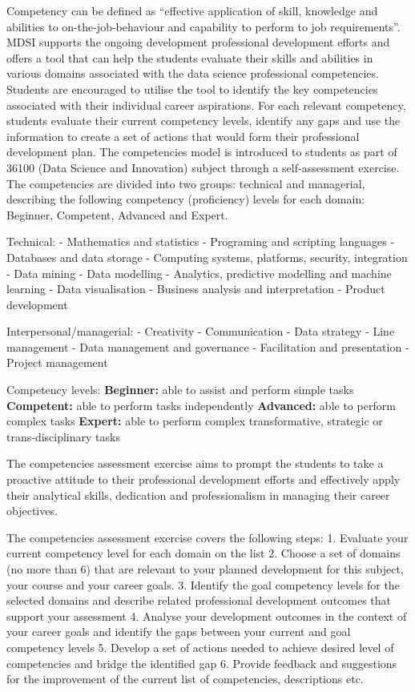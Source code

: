 \documentclass[]{book}
\theoremstyle{definition}
\theoremstyle{definition}
\theoremstyle{remark}
\begin{document}
Competency can be defined as ``effective application of skill, knowledge
and abilities to on-the-job-behaviour and capability to perform to job
requirements''. MDSI supports the ongoing development professional
development efforts and offers a tool that can help the students
evaluate their skills and abilities in various domains associated with
the data science professional competencies. Students are encouraged to
utilise the tool to identify the key competencies associated with their
individual career aspirations. For each relevant competency, students
evaluate their current competency levels, identify any gaps and use the
information to create a set of actions that would form their
professional development plan. The competencies model is introduced to
students as part of 36100 (Data Science and Innovation) subject through
a self-assessment exercise. The competencies are divided into two
groups: technical and managerial, describing the following competency
(proficiency) levels for each domain: Beginner, Competent, Advanced and
Expert.

Technical: - Mathematics and statistics - Programing and scripting
languages - Databases and data storage - Computing systems, platforms,
security, integration - Data mining - Data modelling - Analytics,
predictive modelling and machine learning - Data visualisation -
Business analysis and interpretation - Product development

Interpersonal/managerial: - Creativity - Communication - Data strategy -
Line management - Data management and governance - Facilitation and
presentation - Project management

Competency levels: \textbf{Beginner:} able to assist and perform simple
tasks \textbf{Competent:} able to perform tasks independently
\textbf{Advanced:} able to perform complex tasks \textbf{Expert:} able
to perform complex transformative, strategic or trans-disciplinary tasks

The competencies assessment exercise aims to prompt the students to take
a proactive attitude to their professional development efforts and
effectively apply their analytical skills, dedication and
professionalism in managing their career objectives.

The competencies assessment exercise covers the following steps: 1.
Evaluate your current competency level for each domain on the list 2.
Choose a set of domains (no more than 6) that are relevant to your
planned development for this subject, your course and your career goals.
3. Identify the goal competency levels for the selected domains and
describe related professional development outcomes that support your
assessment 4. Analyse your development outcomes in the context of your
career goals and identify the gaps between your current and goal
competency levels 5. Develop a set of actions needed to achieve desired
level of competencies and bridge the identified gap 6. Provide feedback
and suggestions for the improvement of the current list of competencies,
descriptions etc.
\end{document}
